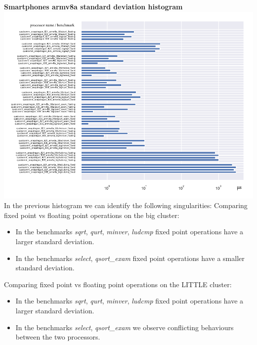 \clearpage
\textbf{Smartphones armv8a standard deviation histogram}\newline
\hspace*{-3.2cm}
\includegraphics[width=570pt]{smartphones_stddev_histogram.pdf}
\clearpage
In the previous histogram we can identify the following singularities:
Comparing fixed point vs floating point operations on the big cluster:
\begin{itemize}
		\item In the benchmarks \textit{sqrt}, \textit{qurt}, \textit{minver}, \textit{ludcmp} fixed point operations have a larger standard deviation.
		\item In the benchmarks \textit{select}, \textit{qsort\_exam} fixed point operations have a smaller standard deviation.
\end{itemize}
Comparing fixed point vs floating point operations on the LITTLE cluster:
\begin{itemize}
		\item In the benchmarks \textit{sqrt}, \textit{qurt}, \textit{minver}, \textit{ludcmp} fixed point operations have a larger standard deviation.
		\item In the benchmarks \textit{select}, \textit{qsort\_exam} we observe conflicting behaviours between the two processors.
\end{itemize}

